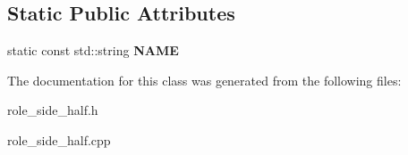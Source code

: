 \subsection*{Static Public Attributes}
\begin{DoxyCompactItemize}
\item 
\hypertarget{classRoleSideHalf_a1b0280ba93888acc322cfcefc58cae6f}{
static const std::string {\bfseries NAME}}
\label{classRoleSideHalf_a1b0280ba93888acc322cfcefc58cae6f}

\end{DoxyCompactItemize}


The documentation for this class was generated from the following files:\begin{DoxyCompactItemize}
\item 
role\_\-side\_\-half.h\item 
role\_\-side\_\-half.cpp\end{DoxyCompactItemize}

